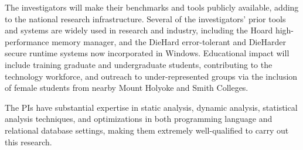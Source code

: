The investigators will make their benchmarks and tools publicly
available, adding to the national research infrastructure. Several of
the investigators' prior tools and systems are widely used in research
and industry, including the Hoard high-performance memory manager, and the
DieHard error-tolerant and DieHarder secure runtime systems now
incorporated in Windows. Educational impact will include training
graduate and undergraduate students, contributing to the technology
workforce, and outreach to under-represented groups via the inclusion
of female students from nearby Mount Holyoke and Smith Colleges.

The PIs have substantial expertise in static analysis, dynamic
analysis, statistical analysis techniques, and optimizations in both
programming language and relational database settings, making them
extremely well-qualified to carry out this research.

